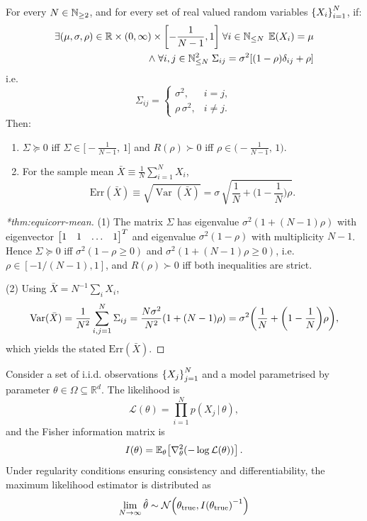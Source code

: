 \begin{theorem}
\noproofref

For every $N\in\mathbb{N}_{\ge2}$, and for every set of real valued random variables $\qty{X_i}_{i=1}^N$, if:
\[
\begin{split}
\exists(\mu,\sigma,\rho)\in\mathbb{R}\times(0,\infty)\times\qty[-\frac1{N-1},1]\;\forall i\in \mathbb{N}_{\le N}\;\operatorname{\mathbb{E}}(X_i) = \mu \\\land\; \forall i, j\in \mathbb{N}_{\le N}^2\;\Sigma_{ij} = \sigma^2\qty[(1 - \rho)\delta_{ij} + \rho]
\end{split}
\]
i.e.
\[
\Sigma_{ij}=
\begin{cases}
\sigma^2,& i=j,\\[2pt]
\rho\,\sigma^2,& i\ne j.
\end{cases}
\]
Then:
\begin{enumerate}
\item $\Sigma\succeq 0$ iff $\Sigma\in\big[-\tfrac{1}{N-1},\,1\big]$ and $R(\rho)\succ 0$ iff $\rho\in\big(-\tfrac{1}{N-1},\,1\big)$.
\item For the sample mean $\bar X \equiv \frac{1}{N}\sum_{i=1}^N X_i$,
\begin{equation}
\mathrm{Err}(\bar X)\equiv\sqrt{\operatorname{Var}(\bar X)}=\sigma\,\sqrt{\frac{1}{N}+\Big(1-\frac{1}{N}\Big)\rho}.
\end{equation}
\end{enumerate}
\end{theorem}

\begin{proof}[*thm:equicorr-mean]
(1) The matrix \(\Sigma\) has eigenvalue $\sigma^2(1+(N-1)\rho)$ with eigenvector $\mqty[1&1&\dots&1]^T$ and eigenvalue $\sigma^2(1-\rho)$ with multiplicity $N-1$.
%
Hence $\Sigma\succeq 0$ iff $\sigma^2(1-\rho\ge 0)$ and $\sigma^2(1+(N-1)\rho\ge 0)$, i.e. $\rho\in[-1/(N-1),1]$, and $R(\rho)\succ 0$ iff both inequalities are strict.

(2) Using $\bar X= N^{-1}\sum_i X_i$,
\[
\operatorname{Var}(\bar X)
=\frac{1}{N^2}\sum_{i,j=1}^N \Sigma_{ij}
    =\frac{N\sigma^2}{N^2}\qty(1+(N-1)\rho)
=\sigma^2\qty(\frac{1}{N}+\qty(1-\frac{1}{N})\rho),
\]
which yields the stated $\mathrm{Err}(\bar X)$.
\end{proof}

\begin{theorem}
\noproofref
    Consider a set of i.i.d. observations \(\qty{X_j}_{j = 1}^N\) and a model parametrised by parameter \(\theta\in\Omega\subseteq\mathbb{R}^{d}\). The likelihood is
    \[
        \mathcal L(\theta) =\prod_{i=1}^{N} p(X_{j}\, | \,\theta),
    \] and the Fisher information matrix is
    \[
        I(\theta) =\mathbb{E}_{\theta}\qty[\laplacian_{\theta}(-\log\mathcal L(\theta))]\,.
    \]
Under regularity conditions ensuring consistency and differentiability,
the maximum likelihood estimator is distributed as
\[
    \lim_{N\to\infty} \hat\theta \sim \mathcal N\qty(\theta_{\text{true}}, I\qty(\theta_{\text{true}})^{-1})
\]
\end{theorem}

